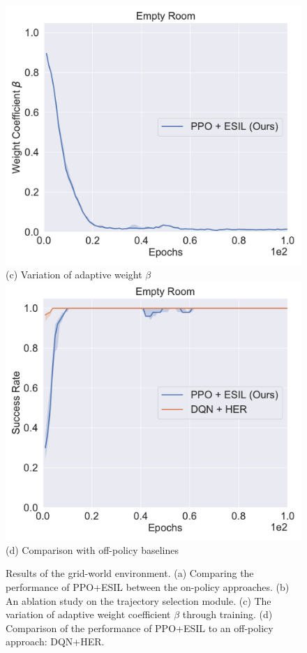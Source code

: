 \begin{figure}[h!]
%
  \centering
  \includegraphics[width=\linewidth]{figures/chapter3/empty_room_samples.pdf}
  ({c}) Variation of adaptive weight $\beta$
\endminipage
{}%
  \centering
  \includegraphics[width=\linewidth]{figures/chapter3/empty_room_her.pdf}
  ({d}) Comparison with off-policy baselines
\endminipage\hfill
\caption[Results of ESIL in the grid-world environment.]{Results of the grid-world environment. ({a}) Comparing the performance of PPO+ESIL between the on-policy approaches. ({b}) An ablation study on the trajectory selection module. ({c}) The variation of adaptive weight coefficient $\beta$ through training. ({d}) Comparison of the performance of PPO+ESIL to an off-policy approach: DQN+HER.}
\label{fig:toy_results}
\end{figure}

